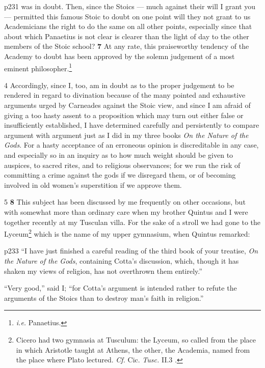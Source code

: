 p231 was in doubt. Then, since the Stoics \texthebrew{—} much against their will I grant you \texthebrew{—} permitted this famous Stoic to doubt on one point will they not grant to us Academicians the right to do the same on all other points, especially since that about which Panaetius is not clear is clearer than the light of day to the other members of the Stoic school? \textbf{7} At any rate, this praiseworthy tendency of the Academy to doubt has been approved by the solemn judgement of a most eminent philosopher.\footnote{\emph{i.e.} Panaetius.

}

4
Accordingly, since I, too, am in doubt as to the proper judgement to be rendered in regard to divination because of the many pointed and exhaustive arguments urged by Carneades against the Stoic view, and since I am afraid of giving a too hasty assent to a proposition which may turn out either false or insufficiently established, I have determined carefully and persistently to compare argument with argument just as I did in my three books \emph{On the Nature of the Gods}. For a hasty acceptance of an erroneous opinion is discreditable in any case, and especially so in an inquiry as to how much weight should be given to auspices, to sacred rites, and to religious observances; for we run the risk of committing a crime against the gods if we disregard them, or of becoming involved in old women's superstition if we approve them.

5
\textbf{8} This subject has been discussed by me frequently on other occasions, but with somewhat more than ordinary care when my brother Quintus and I were together recently at my Tusculan villa. For the sake of a stroll we had gone to the Lyceum\texthebrew{}\footnote{Cicero had two gymnasia at Tusculum: the Lyceum, so called from the place in which Aristotle taught at Athens, the other, the Academia, named from the place where Plato lectured. \emph{Cf.} Cic. \emph{Tusc.} II.3 .

} which is the name of my upper gymnasium, when Quintus remarked:

p233
``I have just finished a careful reading of the third book of your treatise, \emph{On the Nature of the Gods}, containing Cotta's discussion, which, though it has shaken my views of religion, has not overthrown them entirely.''

``Very good,'' said I; ``for Cotta's argument is intended rather to refute the arguments of the Stoics than to destroy man's faith in religion.''

